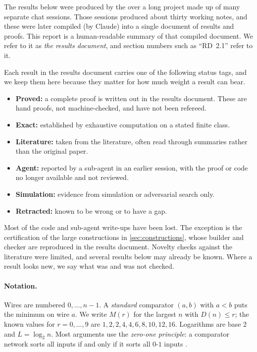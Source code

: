 



The results below were produced by the over a long project made up of many separate chat sessions. Those sessions produced about thirty working notes, and these were later compiled (by Claude) into a single document of results and proofs. This report is a human-readable summary of that compiled document. We refer to it as \emph{the results document}, and section numbers such as ``RD~2.1'' refer to it.

Each result in the results document carries one of the following status tags, and we keep them here because they matter for how much weight a result can bear.
\begin{itemize}
    \item \textbf{Proved:} a complete proof is written out in the results document. These are hand proofs, not machine-checked, and have not been refereed.
    \item \textbf{Exact:} established by exhaustive computation on a stated finite class.
    \item \textbf{Literature:} taken from the literature, often read through summaries rather than the original paper.
    \item \textbf{Agent:} reported by a sub-agent in an earlier session, with the proof or code no longer available and not reviewed.
    \item \textbf{Simulation:} evidence from simulation or adversarial search only.
    \item \textbf{Retracted:} known to be wrong or to have a gap.
\end{itemize}
Most of the code and sub-agent write-ups have been lost. The exception is the certification of the large constructions in \cref{sec:constructions}, whose builder and checker are reproduced in the results document. Novelty checks against the literature were limited, and several results below may already be known. Where a result looks new, we say what was and was not checked.

\paragraph{Notation.} Wires are numbered $0, \dots, n-1$. A \emph{standard} comparator $(a,b)$ with $a < b$ puts the minimum on wire $a$. We write $M(r)$ for the largest $n$ with $D(n) \le r$; the known values for $r = 0, \dots, 9$ are $1,2,2,4,4,6,8,10,12,16$. Logarithms are base 2 and $L = \log_2 n$. Most arguments use the \emph{zero-one principle}: a comparator network sorts all inputs if and only if it sorts all $0$-$1$ inputs \cite[Section 5.3.4]{knuth1998art}.

